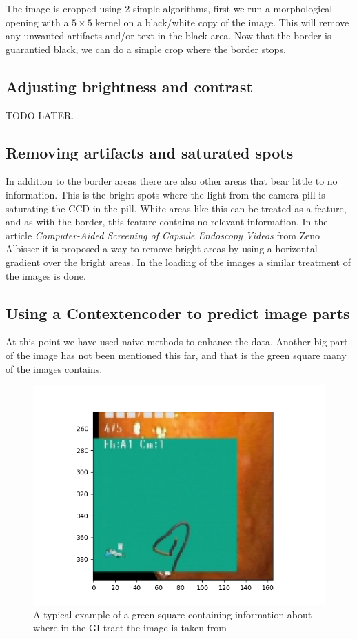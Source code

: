     The image is cropped using 2 simple algorithms, first we run a morphological opening with a $5\times5$ kernel on a black/white copy of the image. 
    This will remove any unwanted artifacts and/or text in the black area. Now that the border is guarantied black, we can do a simple crop where the border stops.
    
    
  \subsection{Adjusting brightness and contrast}
  TODO LATER.
  
  \subsection{Removing artifacts and saturated spots}
  In addition to the border areas there are also other areas that bear little to no information. This is the bright spots where the light from the camera-pill is saturating the CCD in the pill.
  White areas like this can be treated as a feature, and as with the border, this feature contains no relevant information.
  In the article \textit{Computer-Aided Screening of Capsule Endoscopy Videos} from Zeno Albisser it is proposed a way to remove bright areas by using a horizontal gradient over the bright areas.
  In the loading of the images a similar treatment %
  of the images is done.
  
  \subsection{Using a Contextencoder to predict image parts}
  At this point we have used naive methods to enhance the data. Another big part of the image has not been mentioned this far, and that is the green square many of the images contains.
  
  \begin{figure}[h]
    \centering
    \includegraphics[scale=0.5]{methods/figures/Green_square.png}
    \caption{A typical example of a green square containing information about where in the GI-tract the image is taken from}
  \end{figure}
  
